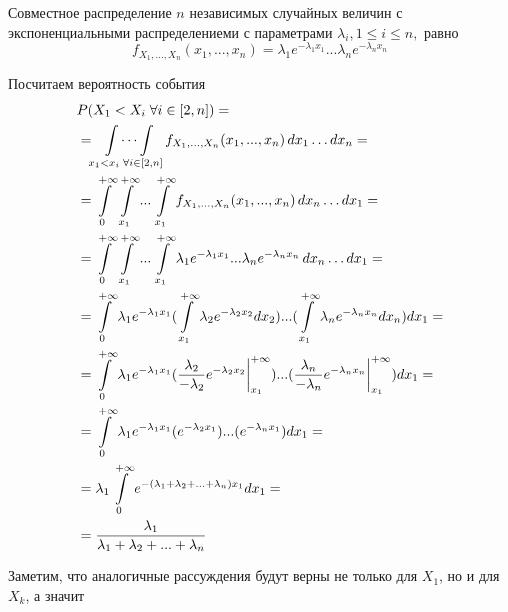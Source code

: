 \documentclass{article}
\begin{document}
    Совместное распределение $n$ независимых случайных величин с экспоненциальными распределениеми
    с параметрами $\lambda_i, 1\leq{}i\leq{}n,$ равно
    \begin{equation}
    f_{X_1,...,X_n}(x_1,...,x_n)
    =\lambda_{1}e^{-\lambda_{1}x_{1}}...\lambda_{n}e^{-\lambda_{n}x_{n}}
    \end{equation}

    Посчитаем вероятность события
    \begin{equation}
    \begin{split}
    &P(X_1<X_i\;\forall{i}\in{[2,n]})= \\
&=
    \idotsint\displaylimits_{x_1<x_i\;\forall{i}\in{[2,n]}}
    f_{X_1,...,X_n}(x_1,...,x_n)
    \,dx_1\dots{}dx_n= \\
&=
    \int\displaylimits_{0}^{+\infty}
    \int\displaylimits_{x_1}^{+\infty}
    ...
    \int\displaylimits_{x_1}^{+\infty}
    f_{X_1,...,X_n}(x_1,...,x_n)
    \,dx_n\dots{}dx_1= \\
&=
    \int\displaylimits_{0}^{+\infty}
    \int\displaylimits_{x_1}^{+\infty}
    ...
    \int\displaylimits_{x_1}^{+\infty}
    \lambda_{1}e^{-\lambda_{1}x_{1}}...\lambda_{n}e^{-\lambda_{n}x_{n}}
    \,dx_n\dots{}dx_1= \\
&=
    \int\displaylimits_{0}^{+\infty}
    \lambda_{1}e^{-\lambda_{1}x_{1}}
    (
    \int\displaylimits_{x_1}^{+\infty}
    \lambda_{2}e^{-\lambda_{2}x_{2}}
    dx_2
    )...(
    \int\displaylimits_{x_1}^{+\infty}
    \lambda_{n}e^{-\lambda_{n}x_{n}}
    dx_n
    )
    dx_1= \\
&=
    \int\displaylimits_{0}^{+\infty}
    \lambda_{1}e^{-\lambda_{1}x_{1}}
    (
    \frac{\lambda_{2}}{-\lambda_{2}}e^{-\lambda_{2}x_{2}}
    \bigg\rvert_{x_1}^{+\infty}
    )...(
    \frac{\lambda_{n}}{-\lambda_{n}}e^{-\lambda_{n}x_{n}}
    \bigg\rvert_{x_1}^{+\infty}
    )
    dx_1= \\
&=
    \int\displaylimits_{0}^{+\infty}
    \lambda_{1}e^{-\lambda_{1}x_{1}}
    (
    e^{-\lambda_{2}x_{1}}
    )...(
    e^{-\lambda_{n}x_{1}}
    )
    dx_1= \\
&=
    \lambda_{1}
    \int\displaylimits_{0}^{+\infty}
    e^{-(\lambda_{1} + \lambda_{2} + ... + \lambda_{n})x_{1}}
    dx_1= \\
&=
    \frac{\lambda_{1}}{\lambda_{1} + \lambda_{2} + ... + \lambda_{n}}
    \end{split}
    \end{equation}

    Заметим, что аналогичные рассуждения будут верны не только для $X_1$, но и для $X_k$, а значит
    \begin{equation}

    \end{equation}
\end{document}
